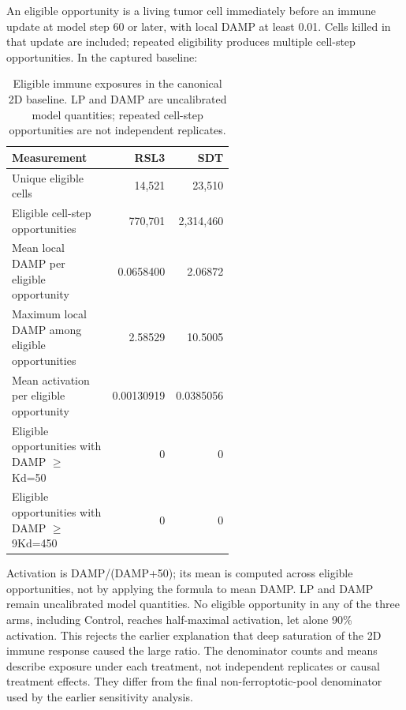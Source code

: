 \documentclass[11pt,twoside,openright]{report}
\begin{document}
An eligible opportunity is a living tumor cell immediately before an immune update at model step 60 or later, with local DAMP at least 0.01. Cells killed in that update are included; repeated eligibility produces multiple cell-step opportunities. In the captured baseline:

\begin{table}[tbp]
\caption{Eligible immune exposures in the canonical 2D baseline. LP and DAMP are uncalibrated model quantities; repeated cell-step opportunities are not independent replicates.}
\label{tab:immune-measurements}
\booktablesize\begin{tabular}{@{}p{0.56\linewidth}rr@{}}
\toprule
\textbf{Measurement} & \textbf{RSL3} & \textbf{SDT} \\
\midrule
Unique eligible cells & 14,521 & 23,510 \\
Eligible cell-step opportunities & 770,701 & 2,314,460 \\
Mean local DAMP per eligible opportunity & 0.0658400 & 2.06872 \\
Maximum local DAMP among eligible opportunities & 2.58529 & 10.5005 \\
Mean activation per eligible opportunity & 0.00130919 & 0.0385056 \\
Eligible opportunities with DAMP $\geq$ Kd=50 & 0 & 0 \\
Eligible opportunities with DAMP $\geq$ 9Kd=450 & 0 & 0 \\
\bottomrule
\end{tabular}
\end{table}
Activation is DAMP/(DAMP+50); its mean is computed across eligible opportunities, not by applying the formula to mean DAMP. LP and DAMP remain uncalibrated model quantities. No eligible opportunity in any of the three arms, including Control, reaches half-maximal activation, let alone 90\% activation. This rejects the earlier explanation that deep saturation of the 2D immune response caused the large ratio. The denominator counts and means describe exposure under each treatment, not independent replicates or causal treatment effects. They differ from the final non-ferroptotic-pool denominator used by the earlier sensitivity analysis.
\end{document}
